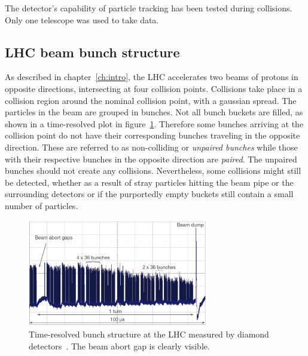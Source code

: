 
The detector's capability of particle tracking has been tested during collisions. Only one telescope was used to take data. 

\subsection{LHC beam bunch structure}
As described in chapter~\ref{ch:intro}, the LHC accelerates two beams of protons in opposite directions, intersecting at four collision points. Collisions take place in a collision region around the nominal collision point, with a gaussian spread. The particles in the beam are grouped in bunches. Not all bunch buckets are filled, as shown in a time-resolved plot in figure~\ref{fig:lhcbunch}. Therefore some bunches arriving at the collision point do not have their corresponding bunches traveling in the opposite direction. These are referred to as non-colliding or \emph{unpaired bunches} while those with their respective bunches in the opposite direction are \emph{paired}. The unpaired bunches should not create any collisions. Nevertheless, some collisions might still be detected, whether as a result of stray particles hitting the beam pipe or the surrounding detectors or if the purportedly empty buckets still contain a small number of particles.
\begin{figure}[!t]
\centering
\includegraphics[width=0.7\textwidth]{04_charge_monitoring/pics/lhcbunch}
\caption{Time-resolved bunch structure at the LHC measured by diamond detectors~\cite{GRIES:00005}. The beam abort gap is clearly visible.}
\label{fig:lhcbunch}
\end{figure}

